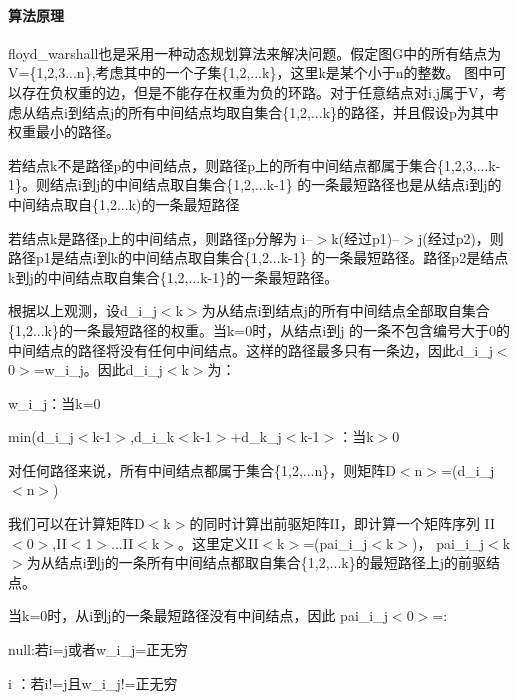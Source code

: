 \paragraph*{算法原理}

floyd\+\_\+warshall也是采用一种动态规划算法来解决问题。假定图\+G中的所有结点为\+V=\{1,2,3...n\},考虑其中的一个子集\{1,2,...k\}，这里k是某个小于n的整数。 图中可以存在负权重的边，但是不能存在权重为负的环路。对于任意结点对i,j属于\+V，考虑从结点i到结点j的所有中间结点均取自集合\{1,2,...k\}的路径，并且假设p为其中权重最小的路径。


\begin{DoxyItemize}
\item 若结点k不是路径p的中间结点，则路径p上的所有中间结点都属于集合\{1,2,3,...k-\/1\}。则结点i到j的中间结点取自集合\{1,2,...k-\/1\} 的一条最短路径也是从结点i到j的中间结点取自\{1,2...k)的一条最短路径
\item 若结点k是路径p上的中间结点，则路径p分解为 i--$>$k(经过p1)--$>$j(经过p2)，则路径p1是结点i到k的中间结点取自集合\{1,2...k-\/1\} 的一条最短路径。路径p2是结点k到j的中间结点取自集合\{1,2,...k-\/1\}的一条最短路径。
\end{DoxyItemize}

根据以上观测，设d\+\_\+i\+\_\+j$<$k$>$为从结点i到结点j的所有中间结点全部取自集合\{1,2...k\}的一条最短路径的权重。当k=0时，从结点i到j 的一条不包含编号大于0的中间结点的路径将没有任何中间结点。这样的路径最多只有一条边，因此d\+\_\+i\+\_\+j$<$0$>$=w\+\_\+i\+\_\+j。因此d\+\_\+i\+\_\+j$<$k$>$为：


\begin{DoxyItemize}
\item w\+\_\+i\+\_\+j：当k=0
\item min(d\+\_\+i\+\_\+j$<$k-\/1$>$,d\+\_\+i\+\_\+k$<$k-\/1$>$+d\+\_\+k\+\_\+j$<$k-\/1$>$：当k$>$0
\end{DoxyItemize}

对任何路径来说，所有中间结点都属于集合\{1,2,...n\}，则矩阵\+D$<$n$>$=(d\+\_\+i\+\_\+j$<$n$>$)

我们可以在计算矩阵\+D$<$k$>$的同时计算出前驱矩阵\+I\+I，即计算一个矩阵序列 I\+I$<$0$>$,I\+I$<$1$>$...I\+I$<$k$>$。这里定义\+I\+I$<$k$>$=(pai\+\_\+i\+\_\+j$<$k$>$)， pai\+\_\+i\+\_\+j$<$k$>$为从结点i到j的一条所有中间结点都取自集合\{1,2,...k\}的最短路径上j的前驱结点。

当k=0时，从i到j的一条最短路径没有中间结点，因此 pai\+\_\+i\+\_\+j$<$0$>$=\+:


\begin{DoxyItemize}
\item null\+:若i=j或者w\+\_\+i\+\_\+j=正无穷
\item i ：若i!=j且w\+\_\+i\+\_\+j!=正无穷
\end{DoxyItemize}

